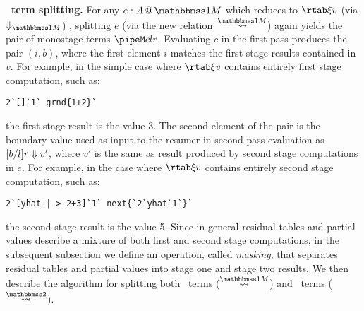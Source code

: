 \begin{abstrsyn}


\textbf{\bbonem\ term splitting.}  For any $\colmix e A$ which reduces
to $\rtab \xi v$ (via $\redonesym$) , splitting $e$ (via the new
relation~$\splitonesym$) again yields the pair of monostage terms
$\pipeM c l r$. Evaluating $c$ in the first pass produces the pair
$(i,b)$, where the first element $i$ matches the first stage results
contained in $v$.  For example, in the simple case where $\rtab \xi v$
contains entirely first stage computation, such as:
\begin{lstlisting}
2`[]`1` grnd{1+2}`
\end{lstlisting}
the first stage result is the value 3.  The second element of the pair
is the boundary value used as input to the resumer in second pass
evaluation as ${[b/l]r} \Downarrow {v'}$, where $v'$ is the same as
result produced by second stage computations in $e$.  For example, in
the case where $\rtab \xi v$ contains entirely second stage
computation, such as:
\begin{lstlisting}
2`[yhat |-> 2+3]`1` next{`2`yhat`1`}`
\end{lstlisting}
the second stage result is the value 5. Since in general residual
tables and partial values describe a mixture of both first and second
stage computations, in the subsequent subsection we define an
operation, called {\em masking}, that separates residual tables and
partial values into stage one and stage two results. We then describe
the algorithm for splitting both \bbonem\ terms ($\splitonesym$) and
\bbtwo\ terms ($\splittwosym$).





\end{abstrsyn}
